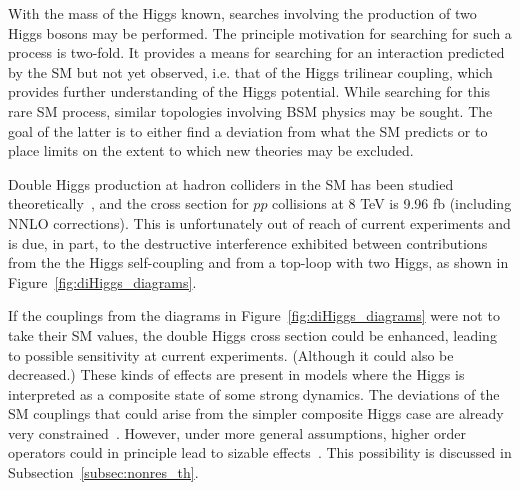 With the mass of the Higgs known, searches involving the production of two Higgs bosons may
be performed. The principle motivation for searching for such a process is two-fold.
It provides a means for searching for an interaction predicted by the SM but not yet observed, i.e. that
of the Higgs trilinear coupling, which provides further understanding of the Higgs potential.
While searching for this rare SM process, similar topologies involving BSM physics may
be sought. The goal of the latter is to either find a deviation from what the SM predicts
or to place limits on the extent to which new theories may be excluded.

Double Higgs production at hadron colliders in the SM has been studied
theoretically~\cite{Baglio:2012np,Plehn:1996wb}, and the cross section for $pp$ collisions at 8 TeV
is 9.96 fb (including NNLO corrections). This is unfortunately out of reach of current
experiments and is due, in part, to the destructive interference exhibited between contributions
from the the Higgs self-coupling and from a top-loop with two Higgs, as shown in
Figure~\ref{fig:diHiggs_diagrams}.

If the couplings from the diagrams in Figure~\ref{fig:diHiggs_diagrams} were not to take their SM
values, the double Higgs cross section could be enhanced, leading to possible sensitivity
at current experiments. (Although it could also be decreased.)
These kinds of effects are present in models
where the Higgs is interpreted as a composite state of some strong dynamics. The deviations
of the SM couplings that could arise from the simpler composite Higgs case are
already very constrained~\cite{Ellis:2013ywa,Ellis:2013lra}.
However, under more general assumptions, higher order
operators could in principle lead to sizable effects~\cite{Belyaev:1999mx,Dib:2005re,Oliveira:2010uv}.
This possibility is discussed in Subsection~\ref{subsec:nonres_th}.

